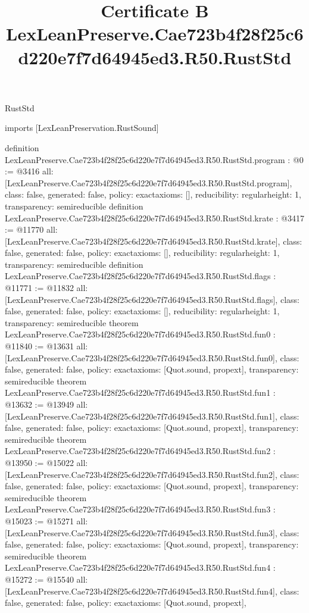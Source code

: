 \begin{lexlean}{RustStd}
\title{Certificate B LexLeanPreserve.Cae723b4f28f25c6d220e7f7d64945ed3.R50.RustStd}
\begin{coremodule}
imports [LexLeanPreservation.RustSound]

definition LexLeanPreserve.Cae723b4f28f25c6d220e7f7d64945ed3.R50.RustStd.program : @0 := @3416 {
  all: [LexLeanPreserve.Cae723b4f28f25c6d220e7f7d64945ed3.R50.RustStd.program],
  class: false,
  generated: false,
  policy: exact{axioms: []},
  reducibility: regular{height: 1},
  transparency: semireducible
}
definition LexLeanPreserve.Cae723b4f28f25c6d220e7f7d64945ed3.R50.RustStd.krate : @3417 := @11770 {
  all: [LexLeanPreserve.Cae723b4f28f25c6d220e7f7d64945ed3.R50.RustStd.krate],
  class: false,
  generated: false,
  policy: exact{axioms: []},
  reducibility: regular{height: 1},
  transparency: semireducible
}
definition LexLeanPreserve.Cae723b4f28f25c6d220e7f7d64945ed3.R50.RustStd.flags : @11771 := @11832 {
  all: [LexLeanPreserve.Cae723b4f28f25c6d220e7f7d64945ed3.R50.RustStd.flags],
  class: false,
  generated: false,
  policy: exact{axioms: []},
  reducibility: regular{height: 1},
  transparency: semireducible
}
theorem LexLeanPreserve.Cae723b4f28f25c6d220e7f7d64945ed3.R50.RustStd.fun0 : @11840 := @13631 {
  all: [LexLeanPreserve.Cae723b4f28f25c6d220e7f7d64945ed3.R50.RustStd.fun0],
  class: false,
  generated: false,
  policy: exact{axioms: [Quot.sound, propext]},
  transparency: semireducible
}
theorem LexLeanPreserve.Cae723b4f28f25c6d220e7f7d64945ed3.R50.RustStd.fun1 : @13632 := @13949 {
  all: [LexLeanPreserve.Cae723b4f28f25c6d220e7f7d64945ed3.R50.RustStd.fun1],
  class: false,
  generated: false,
  policy: exact{axioms: [Quot.sound, propext]},
  transparency: semireducible
}
theorem LexLeanPreserve.Cae723b4f28f25c6d220e7f7d64945ed3.R50.RustStd.fun2 : @13950 := @15022 {
  all: [LexLeanPreserve.Cae723b4f28f25c6d220e7f7d64945ed3.R50.RustStd.fun2],
  class: false,
  generated: false,
  policy: exact{axioms: [Quot.sound, propext]},
  transparency: semireducible
}
theorem LexLeanPreserve.Cae723b4f28f25c6d220e7f7d64945ed3.R50.RustStd.fun3 : @15023 := @15271 {
  all: [LexLeanPreserve.Cae723b4f28f25c6d220e7f7d64945ed3.R50.RustStd.fun3],
  class: false,
  generated: false,
  policy: exact{axioms: [Quot.sound, propext]},
  transparency: semireducible
}
theorem LexLeanPreserve.Cae723b4f28f25c6d220e7f7d64945ed3.R50.RustStd.fun4 : @15272 := @15540 {
  all: [LexLeanPreserve.Cae723b4f28f25c6d220e7f7d64945ed3.R50.RustStd.fun4],
  class: false,
  generated: false,
  policy: exact{axioms: [Quot.sound, propext]},
}
\end{coremodule}
\end{lexlean}
